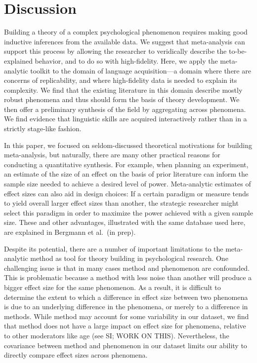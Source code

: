\documentclass[english,floatsintext,man]{apa6}
\begin{document}
\section{Discussion}\label{discussion}

Building a theory of a complex psychological phenomenon requires making
good inductive inferences from the available data. We suggest that
meta-analysis can support this process by allowing the researcher to
veridically describe the to-be-explained behavior, and to do so with
high-fidelity. Here, we apply the meta-analytic toolkit to the domain of
language acquisition---a domain where there are concerns of
replicability, and where high-fidelity data is needed to explain its
complexity. We find that the existing literature in this domain describe
mostly robust phenomena and thus should form the basis of theory
development. We then offer a preliminary synthesis of the field by
aggregating across phenomena. We find evidence that linguistic skills
are acquired interactively rather than in a strictly stage-like fashion.

In this paper, we focused on seldom-discussed theoretical motivations
for building meta-analysis, but naturally, there are many other
practical reasons for conducting a quantitative synthesis. For example,
when planning an experiment, an estimate of the size of an effect on the
basis of prior literature can inform the sample size needed to achieve a
desired level of power. Meta-analytic estimates of effect sizes can also
aid in design choices: If a certain paradigm or measure tends to yield
overall larger effect sizes than another, the strategic researcher might
select this paradigm in order to maximize the power achieved with a
given sample size. These and other advantages, illustrated with the same
database used here, are explained in Bergmann et al.~(in prep).

Despite its potential, there are a number of important limitations to
the meta-analytic method as tool for theory building in psychological
research. One challenging issue is that in many cases method and
phenomenon are confounded. This is problematic because a method with
less noise than another will produce a bigger effect size for the same
phenomenon. As a result, it is difficult to determine the extent to
which a difference in effect size between two phenomena is due to an
underlying difference in the phenomena, or merely to a difference in
methods. While method may account for some variability in our dataset,
we find that method does not have a large impact on effect size for
phenomena, relative to other moderators like age (see SI; WORK ON THIS).
Nevertheless, the covariance between method and phenomenon in our
dataset limits our ability to directly compare effect sizes across
phenomena.
\end{document}
